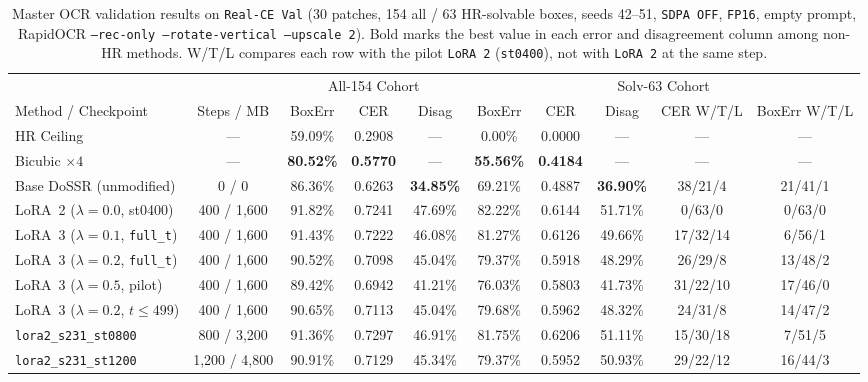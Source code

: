 \documentclass[11pt]{article}
\begin{document}
\begin{table}[ht]
\centering
\scriptsize
\setlength{\tabcolsep}{2.1pt}
\caption{Master OCR validation results on \texttt{Real-CE Val} (30 patches, 154 all / 63 HR-solvable boxes, seeds 42--51, \texttt{SDPA OFF}, \texttt{FP16}, empty prompt, RapidOCR \texttt{--rec-only --rotate-vertical --upscale 2}). Bold marks the best value in each error and disagreement column among non-HR methods. W/T/L compares each row with the pilot \texttt{LoRA~2} (\texttt{st0400}), not with \texttt{LoRA~2} at the same step.}
\label{tab:master_ocr}
\begin{tabular}{lccccccccc}
\toprule
 & & \multicolumn{3}{c}{All-154 Cohort} & \multicolumn{5}{c}{Solv-63 Cohort} \\
\cmidrule(lr){3-5} \cmidrule(lr){6-10}
Method / Checkpoint & Steps / MB & BoxErr & CER & Disag & BoxErr & CER & Disag & CER W/T/L & BoxErr W/T/L \\
\midrule
HR Ceiling & --- & 59.09\% & 0.2908 & --- & 0.00\% & 0.0000 & --- & --- & --- \\
Bicubic $\times 4$ & --- & \textbf{80.52\%} & \textbf{0.5770} & --- & \textbf{55.56\%} & \textbf{0.4184} & --- & --- & --- \\
Base DoSSR (unmodified) & 0 / 0 & 86.36\% & 0.6263 & \textbf{34.85\%} & 69.21\% & 0.4887 & \textbf{36.90\%} & 38/21/4 & 21/41/1 \\
\midrule
LoRA~2 ($\lambda=0.0$, st0400) & 400 / 1,600 & 91.82\% & 0.7241 & 47.69\% & 82.22\% & 0.6144 & 51.71\% & 0/63/0 & 0/63/0 \\
LoRA~3 ($\lambda=0.1$, \texttt{full\_t}) & 400 / 1,600 & 91.43\% & 0.7222 & 46.08\% & 81.27\% & 0.6126 & 49.66\% & 17/32/14 & 6/56/1 \\
LoRA~3 ($\lambda=0.2$, \texttt{full\_t}) & 400 / 1,600 & 90.52\% & 0.7098 & 45.04\% & 79.37\% & 0.5918 & 48.29\% & 26/29/8 & 13/48/2 \\
LoRA~3 ($\lambda=0.5$, pilot) & 400 / 1,600 & 89.42\% & 0.6942 & 41.21\% & 76.03\% & 0.5803 & 41.73\% & 31/22/10 & 17/46/0 \\
LoRA~3 ($\lambda=0.2$, $t\le 499$) & 400 / 1,600 & 90.65\% & 0.7113 & 45.04\% & 79.68\% & 0.5962 & 48.32\% & 24/31/8 & 14/47/2 \\
\midrule
\texttt{lora2\_s231\_st0800} & 800 / 3,200 & 91.36\% & 0.7297 & 46.91\% & 81.75\% & 0.6206 & 51.11\% & 15/30/18 & 7/51/5 \\
\texttt{lora2\_s231\_st1200} & 1,200 / 4,800 & 90.91\% & 0.7129 & 45.34\% & 79.37\% & 0.5952 & 50.93\% & 29/22/12 & 16/44/3 \\

\end{tabular}
\end{table}
\end{document}
